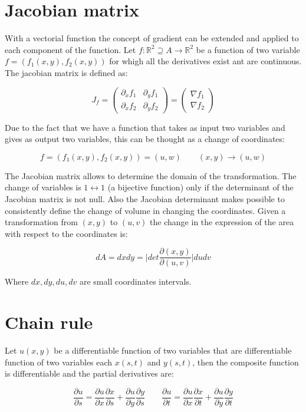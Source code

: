 \section{Jacobian matrix}
With a vectorial function the concept of gradient can be extended and applied to each component of the function.
Let $f:\mathbb{R}^2\supseteq A\rightarrow\mathbb{R}^2$ be a function of two variable $f = (f_1(x, y), f_2(x, y))$ for whigh all the derivatives exist ant are continuous.
The jacobian matrix is defined as:

$$J_f = \begin{pmatrix} \partial_x f_1 & \partial_y f_1\\\partial_x f_2 & \partial_y f_2\end{pmatrix} = \begin{pmatrix} \nabla f_1\\\nabla f_2\end{pmatrix}$$

Due to the fact that we have a function that takes as input two variables and gives as output two variables, this can be thought as a change of coordinates:

$$f = (f_1(x, y), f_2(x, y)) = (u, w)\qquad (x, y)\rightarrow (u, w)$$

The Jacobian matrix allows to determine the domain of the transformation.
The change of variables is $1\leftrightarrow 1$ (a bijective function) only if the determinant of the Jacobian matrix is not null.
Also the Jacobian determinant makes possible to consistently define the change of volume in changing the coordinates.
Given a transformation from $(x, y)$ to $(u, v)$ the change in the expression of the area with respect to the coordinates is:

$$dA = dxdy = \biggl| det\frac{\partial(x, y)}{\partial(u, v)}\biggr|dudv$$

Where $dx, dy, du, dv$ are small coordinates intervals.

\section{Chain rule}
Let $u(x, y)$ be a differentiable function of two variables that are differentiable function of two variables each $x(s, t)$ and $y(s, t)$, then the composite function is differentiable and the partial derivatives are:

$$\frac{\partial u}{\partial s} = \frac{\partial u}{\partial x}\frac{\partial x}{\partial s} + \frac{\partial u}{\partial y}\frac{\partial y}{\partial s}\qquad\frac{\partial u}{\partial t} = \frac{\partial u}{\partial x}\frac{\partial x}{\partial t} + \frac{\partial u}{\partial y}\frac{\partial y}{\partial t}$$

